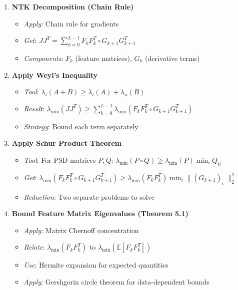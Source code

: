 \documentclass{article}
\newcommand{\E}{\mathbb{E}}
\newcommand{\evmin}[1]{\lambda_{\min}\left(#1\right)}
\begin{document}
\begin{enumerate}
    \item \textbf{NTK Decomposition (Chain Rule)}
    \begin{itemize}
        \item \textit{Apply}: Chain rule for gradients
        \item \textit{Get}: $JJ^T = \sum_{k=0}^{L-1} F_k F_k^T \circ G_{k+1} G_{k+1}^T$
        \item \textit{Components}: $F_k$ (feature matrices), $G_k$ (derivative terms)
    \end{itemize}
    
    \item \textbf{Apply Weyl's Inequality}
    \begin{itemize}
        \item \textit{Tool}: $\lambda_i(A + B) \geq \lambda_i(A) + \lambda_n(B)$
        \item \textit{Result}: $\evmin{JJ^T} \geq \sum_{k=0}^{L-1} \evmin{F_k F_k^T \circ G_{k+1} G_{k+1}^T}$
        \item \textit{Strategy}: Bound each term separately
    \end{itemize}
    
    \item \textbf{Apply Schur Product Theorem}
    \begin{itemize}
        \item \textit{Tool}: For PSD matrices $P, Q$: $\evmin{P \circ Q} \geq \evmin{P} \min_i Q_{ii}$
        \item \textit{Get}: $\evmin{F_k F_k^T \circ G_{k+1} G_{k+1}^T} \geq \evmin{F_k F_k^T} \min_i \|(G_{k+1})_{i:}\|_2^2$
        \item \textit{Reduction}: Two separate problems to solve
    \end{itemize}
    
    \item \textbf{Bound Feature Matrix Eigenvalues (Theorem 5.1)}
    \begin{itemize}
        \item \textit{Apply}: Matrix Chernoff concentration
        \item \textit{Relate}: $\evmin{F_k F_k^T}$ to $\evmin{\E[F_k F_k^T]}$
        \item \textit{Use}: Hermite expansion for expected quantities
        \item \textit{Apply}: Gershgorin circle theorem for data-dependent bounds
    \end{itemize}
    

\end{enumerate}
\end{document}
